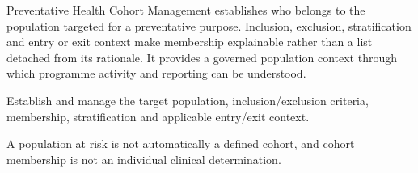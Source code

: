 Preventative Health Cohort Management establishes who belongs to the population targeted for a preventative purpose. Inclusion, exclusion, stratification and entry or exit context make membership explainable rather than a list detached from its rationale. It provides a governed population context through which programme activity and reporting can be understood.



Establish and manage the target population, inclusion/\allowbreak{}exclusion criteria, membership, stratification and applicable entry/\allowbreak{}exit context.



A population at risk is not automatically a defined cohort, and cohort membership is not an individual clinical determination.


